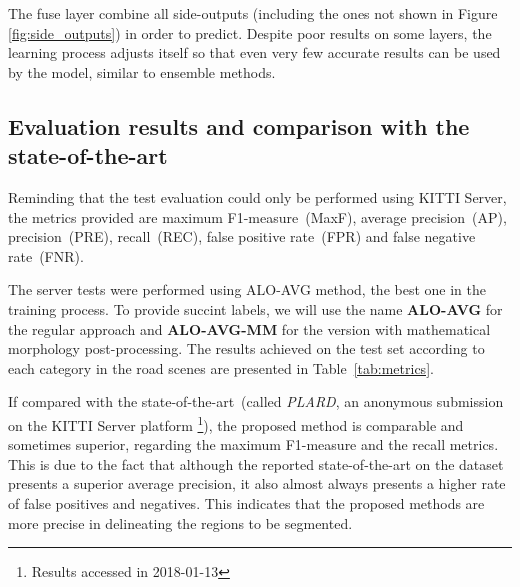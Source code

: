 The fuse layer combine all side-outputs (including the ones not shown in Figure \ref{fig:side_outputs}) in order to predict. Despite poor results on some layers, the learning process adjusts itself so that even very few accurate results can be used by the model, similar to ensemble methods.


\subsection{Evaluation results and comparison with the state-of-the-art}

Reminding that the test evaluation could only be performed using KITTI Server, the metrics provided are maximum F1-measure~(MaxF), average precision~(AP), precision~(PRE), recall~(REC), false positive rate~(FPR) and false negative rate~(FNR). 

The server tests were performed using ALO-AVG method, the best one in the training process. To provide succint labels, we will use the name \textbf{ALO-AVG} for the regular approach and \textbf{ALO-AVG-MM} for the version with mathematical morphology post-processing. The results achieved  on the test set according to each category in the road scenes are presented in Table~\ref{tab:metrics}. 

If compared with the state-of-the-art~(called \textit{PLARD}, an anonymous submission on the KITTI Server platform \footnote{Results accessed in 2018-01-13}), the proposed method is comparable and sometimes superior, regarding the maximum F1-measure and the recall metrics. This is due to the fact that although the reported state-of-the-art on the dataset presents a superior average precision, it also almost always presents a higher rate of false positives and negatives. This indicates that the proposed methods are more precise in delineating the regions to be segmented.

